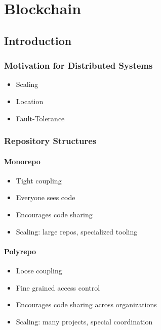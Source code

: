 \documentclass[../Main.tex]{subfiles}
\begin{document}
\chapter{Blockchain}

\intro{

}

\section{Introduction}
\subsection{Motivation for Distributed Systems}
\begin{itemize}
    \item Scaling
    \item Location
    \item Fault-Tolerance
\end{itemize}
\subsection{Repository Structures}
\subsubsection{Monorepo}
\begin{itemize}
    \item Tight coupling
    \item Everyone sees code
    \item Encourages code sharing
    \item Scaling: large repos, specialized tooling
\end{itemize}
\subsubsection{Polyrepo}
\begin{itemize}
    \item Loose coupling
    \item Fine grained access control
    \item Encourages code sharing across organizations
    \item Scaling: many projects, special coordination
\end{itemize}
\end{document}
